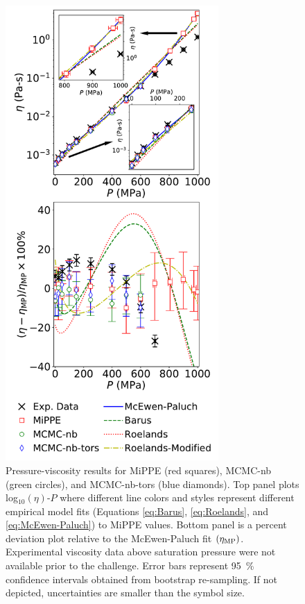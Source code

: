 \documentclass[preprint,review,12pt]{elsarticle}
\begin{document}
	\begin{figure}[H]
		\centering
		\includegraphics[width=3.2in]{viscosity_pressure_results.pdf}
		\caption{Pressure-viscosity results for MiPPE (red squares), MCMC-nb (green circles), and MCMC-nb-tors (blue diamonds). Top panel plots log$_{10}(\eta)$-$P$ where different line colors and styles represent different empirical model fits (Equations \ref{eq:Barus}, \ref{eq:Roelands}, and \ref{eq:McEwen-Paluch}) to MiPPE values. Bottom panel is a percent deviation plot relative to the McEwen-Paluch fit $(\eta_{\rm MP})$. Experimental viscosity data above saturation pressure were not available prior to the challenge. Error bars represent 95~\% confidence intervals obtained from bootstrap re-sampling. If not depicted, uncertainties are smaller than the symbol size.}
		\label{fig:viscosity_pressure}
	\end{figure}
	
\end{document}
